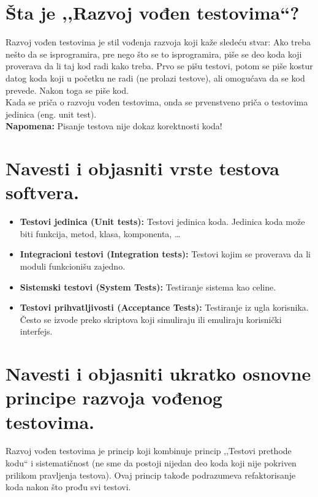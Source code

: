 \documentclass[a4paper]{article}
\begin{document}
\section{Šta je ,,Razvoj vođen testovima``?}
  Razvoj vođen testovima je stil vođenja razvoja koji kaže sledeću stvar: Ako treba nešto 
  da se isprogramira, pre nego što se to isprogramira, piše se deo koda koji proverava
  da li taj kod radi kako treba. Prvo se pišu testovi, potom se piše kostur datog koda koji
  u početku ne radi (ne prolazi testove), ali omogućava da se kod prevede. Nakon toga se piše kod.\\

  Kada se priča o razvoju vođen testovima, onda se prvenstveno priča o testovima jedinica (eng. unit
  test).\\

  \noindent \textbf{Napomena:} Pisanje testova nije dokaz korektnosti koda!

\section{Navesti i objasniti vrste testova softvera.}
  \begin{itemize}
    \item \textbf{Testovi jedinica (Unit tests):} Testovi jedinica koda. Jedinica koda
          može biti funkcija, metod, klasa, komponenta, \dots
    \item \textbf{Integracioni testovi (Integration tests):} Testovi kojim se proverava da li
          moduli funkcionišu zajedno.
    \item \textbf{Sistemski testovi (System Tests):} Testiranje sistema kao celine.
    \item \textbf{Testovi prihvatljivosti (Acceptance Tests):} Testiranje iz ugla korisnika. Često
          se izvode preko skriptova koji simuliraju ili emuliraju korisnički interfejs.
  \end{itemize}

\section{Navesti i objasniti ukratko osnovne principe razvoja vođenog testovima.}
  Razvoj vođen testovima je princip koji kombinuje princip ,,Testovi prethode kodu`` i 
  sistematičnost (ne sme da postoji nijedan deo koda koji nije pokriven prilikom pravljenja
  testova). Ovaj princip takođe podrazumeva refaktorisanje koda nakon što prođu svi testovi.
\end{document}
